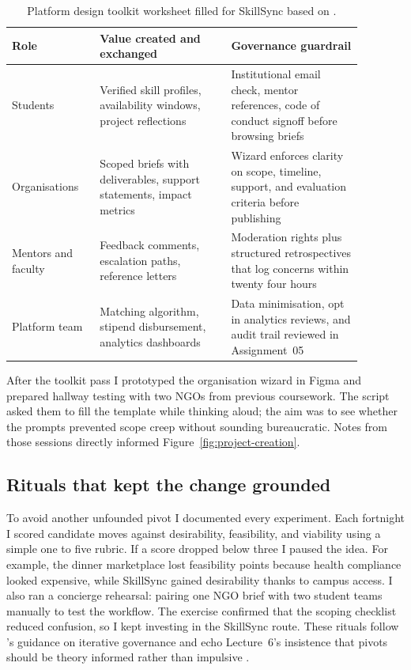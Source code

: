 \begin{table}[H]
  \centering
  \caption{Platform design toolkit worksheet filled for SkillSync based on \citet{Reillier2017}.}
  \label{tab:platform-map}
  \begin{tabular}{p{0.22\linewidth}p{0.33\linewidth}p{0.33\linewidth}}
    \toprule
    Role & Value created and exchanged & Governance guardrail \\
    \midrule
    Students & Verified skill profiles, availability windows, project reflections & Institutional email check, mentor references, code of conduct signoff before browsing briefs \\
    Organisations & Scoped briefs with deliverables, support statements, impact metrics & Wizard enforces clarity on scope, timeline, support, and evaluation criteria before publishing \\
    Mentors and faculty & Feedback comments, escalation paths, reference letters & Moderation rights plus structured retrospectives that log concerns within twenty four hours \\
    Platform team & Matching algorithm, stipend disbursement, analytics dashboards & Data minimisation, opt in analytics reviews, and audit trail reviewed in Assignment~05 \\
    \bottomrule
  \end{tabular}
\end{table}

After the toolkit pass I prototyped the organisation wizard in Figma and prepared hallway testing with two NGOs from previous coursework. The script asked them to fill the template while thinking aloud; the aim was to see whether the prompts prevented scope creep without sounding bureaucratic. Notes from those sessions directly informed Figure~\ref{fig:project-creation}.

\subsection*{Rituals that kept the change grounded}
To avoid another unfounded pivot I documented every experiment. Each fortnight I scored candidate moves against desirability, feasibility, and viability using a simple one to five rubric. If a score dropped below three I paused the idea. For example, the dinner marketplace lost feasibility points because health compliance looked expensive, while SkillSync gained desirability thanks to campus access. I also ran a concierge rehearsal: pairing one NGO brief with two student teams manually to test the workflow. The exercise confirmed that the scoping checklist reduced confusion, so I kept investing in the SkillSync route. These rituals follow \citet{Choudary2016}'s guidance on iterative governance and echo Lecture~6's insistence that pivots should be theory informed rather than impulsive \citep{Lecture06}.

